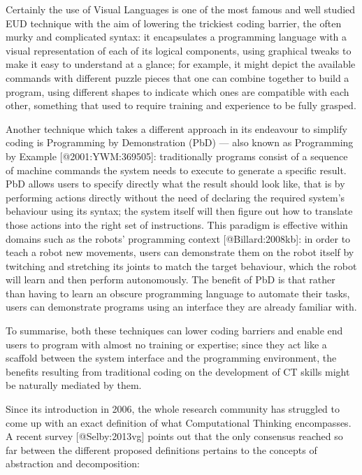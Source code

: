 Certainly the use of Visual Languages is one of the most famous and well studied EUD technique with the aim of lowering the trickiest coding barrier, the often murky and complicated syntax: it encapsulates a programming language with a visual representation of each of its logical components, using graphical tweaks to make it easy to understand at a glance; for example, it might depict the available commands with different puzzle pieces that one can combine together to build a program, using different shapes to indicate which ones are compatible with each other, something that used to require training and experience to be fully grasped.

Another technique which takes a different approach in its endeavour to simplify coding is Programming by Demonstration (PbD) --- also known as Programming by Example [@2001:YWM:369505]: traditionally programs consist of a sequence of machine commands the system needs to execute to generate a specific result. PbD allows users to specify directly what the result should look like, that is by performing actions directly without the need of declaring the required system's behaviour using its syntax; the system itself will then figure out how to translate those actions into the right set of instructions. This paradigm is effective within domains such as the robots' programming context [@Billard:2008kb]: in order to teach a robot new movements, users can demonstrate them on the robot itself by twitching and stretching its joints to match the target behaviour, which the robot will learn and then perform autonomously. The benefit of PbD is that rather than having to learn an obscure programming language to automate their tasks, users can demonstrate programs using an interface they are already familiar with.

To summarise, both these techniques can lower coding barriers and enable end users to program with almost no training or expertise; since they act like a scaffold between the system interface and the programming environment, the benefits resulting from traditional coding on the development of CT skills might be naturally mediated by them.

Since its introduction in 2006, the whole research community has struggled to come up with an exact definition of what Computational Thinking encompasses. A recent survey [@Selby:2013vg] points out that the only consensus reached so far between the different proposed definitions pertains to the concepts of abstraction and decomposition:

